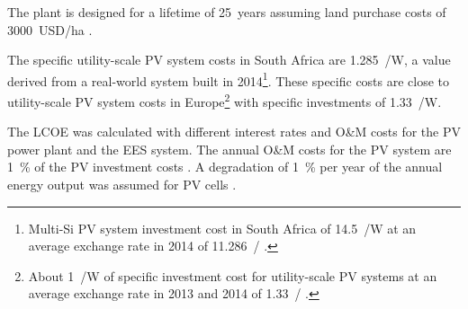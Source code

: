The plant is designed for a lifetime of \SI{25}{years} assuming land purchase costs of \SI{3000}{USD/\hectare} \cite{Cassell2012}.


The specific utility-scale \ac{PV} system costs in South Africa are \SI{1.285}{\usd/\watt}, a value derived from a real-world system built in 2014\footnote{Multi-Si \ac{PV} system investment cost in South Africa of \SI{14.5}{\zar/\watt} \cite{Terblanche2015} at an average exchange rate in 2014 of \SI{11.286}{\usd/\zar} \cite{IRS2015}.}. These specific costs are close to utility-scale \ac{PV} system costs in Europe\footnote{About \SI{1}{\eur/\watt} of specific investment cost for utility-scale \ac{PV} systems \cite{FraunhoferISE2013} at an average exchange rate in 2013 and 2014 of \SI{1.33}{\usd/\eur} \cite{StatistaGmbH2015}.} with specific investments of \SI{1.33}{\usd/\watt}.


The \ac{LCOE} was calculated with different interest rates and \ac{O&M} costs for the \ac{PV} power plant and the \ac{EES} system. The annual \ac{O&M} costs for the \ac{PV} system are \SI{1}{\percent} of the \ac{PV} investment costs \cite{IEA2014a}. A degradation of \SI{1}{\percent} per year of the annual energy output was assumed for \ac{PV} cells \cite{Tidball2010}.

